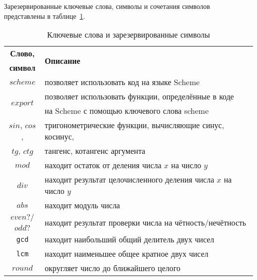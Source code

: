 \begin{itemize}
                Зарезервированные ключевые слова, символы и сочетания символов представлены в таблице~\ref{tabular:kw}.
                \clearpage
                \begin{table}[ht!]
                    \caption{Ключевые слова и зарезервированные символы\bigskip}
                    \centering
                    \label{tabular:kw}
                    \begin{tabular}{|c|l|}
                        \hline
                        \bf{Слово,}                 & \multirow{2}{*}{\bf{Описание}} \\
                        \bf{символ}                 & \\ \hline
                        $scheme$                    & позволяет использовать код на языке Scheme \\ \hline
                        \multirow{2}{*}{$export$ }  & позволяет использовать функции, определённые в коде \\
                                                    & на Scheme с помощью ключевого слова scheme \\ \hline
                        $sin$, $cos$,               & тригонометрические функции, вычисляющие синус, косинус, \\
                        $tg$, $ctg$                 & тангенс, котангенс аргумента \\ \hline
                        $mod$                       & находит остаток от деления числа $x$ на число $y$ \\ \hline
                        $div$                       & находит результат целочисленного деления числа $x$ на число $y$ \\ \hline
                        $abs$                       & находит модуль числа \\ \hline
                        $even?/$                    & \multirow{2}{*}{находит результат проверки числа на чётность/нечётность} \\
                        $odd?$                      & \\ \hline
                        \verb!gcd!                  & находит наибольший общий делитель двух чисел \\ \hline
                        \verb!lcm!                  & находит наименьшее общее кратное двух чисел \\ \hline
                        $round$                     & округляет число до ближайшего целого\\ \hline

\end{tabular}
\end{table}
\end{itemize}
